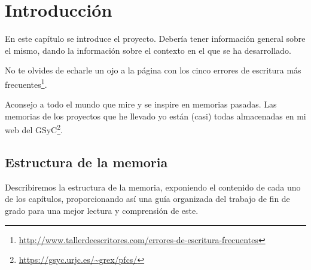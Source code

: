 \documentclass[a4paper, 12pt]{book}
\begin{document}
\tableofcontents 
\cleardoublepage
\listoffigures %



\cleardoublepage
\chapter{Introducción}
\label{chap:introducción}
\label{sec:intro} %

En este capítulo se introduce el proyecto.
Debería tener información general sobre el mismo, dando la información sobre el contexto en el que se ha desarrollado.

No te olvides de echarle un ojo a la página con los cinco errores de escritura más frecuentes\footnote{\url{http://www.tallerdeescritores.com/errores-de-escritura-frecuentes}}.

Aconsejo a todo el mundo que mire y se inspire en memorias pasadas.
Las memorias de los proyectos que he llevado yo están (casi) todas almacenadas en mi web del GSyC\footnote{\url{https://gsyc.urjc.es/~grex/pfcs/}}.


\section{Estructura de la memoria}
\label{sec:estructura}

Describiremos la estructura de la memoria, exponiendo el contenido de cada uno de los capítulos, proporcionando así una guía organizada del trabajo de fin de grado para una mejor lectura y comprensión de este.
\end{document}

